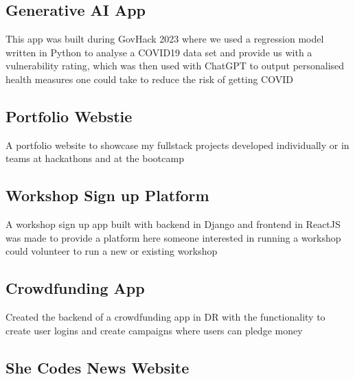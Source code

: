 \documentclass[11pt, a4paper]{TechCV}
\begin{document}
\newpage
\begin{minipage}[t]{1\textwidth}
\sectionsep

\sectionsep

\subsection{Generative AI App} 
This app was built during GovHack 2023 where we used a regression model written in Python to analyse a COVID19 data set and provide us with a vulnerability rating, which was then used with ChatGPT to output personalised health measures one could take to reduce the risk of getting COVID
\sectionsep

\subsection{Portfolio Webstie} 

A portfolio website to showcase my fullstack projects developed individually or in teams at hackathons and at the bootcamp
\sectionsep

\subsection{Workshop Sign up Platform} 

 A workshop sign up app built with backend in Django and frontend in ReactJS was made to provide a platform here someone interested in running a workshop could volunteer to run a new or existing workshop
\sectionsep

\subsection{Crowdfunding App}
 
Created the backend of a crowdfunding app in DR with the functionality to create user logins and create campaigns where users can pledge money
\sectionsep

\subsection{She Codes News Website}
 

\end{minipage}
\end{document}
